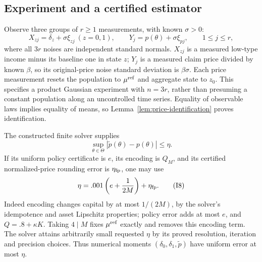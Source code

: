 \documentclass[11pt,a4paper]{article}
\begin{document}
\subsection{Experiment and a certified estimator}
Observe three groups of $r\geq1$ measurements, with known $\sigma>0$:
\[
 X_{zj}=\delta_z+\sigma\xi_{zj}\ (z=0,1),\qquad
 Y_j=p(\theta)+\sigma\xi_{pj},\qquad 1\leq j\leq r,          \tag{I6}
\]
where all $3r$ noises are independent standard normals. $X_{zj}$ is a
measured low-type income minus its baseline one in state $z$; $Y_j$ is a
measured claim price divided by known $\beta$, so its original-price noise
standard deviation is $\beta\sigma$. Each price measurement resets the
population to $\mu^{\rm ref}$ and aggregate state to $z_0$. This specifies
a product Gaussian experiment with $n=3r$, rather than presuming a constant
population along an uncontrolled time series. Equality of observable laws
implies equality of means, so Lemma~\ref{lem:price-identification} proves identification.

The constructed finite solver supplies
\[
 \sup_{\theta\in\Theta}|\widetilde p(\theta)-p(\theta)|\leq\eta. \tag{I7}
\]
If its uniform policy certificate is $e$, its encoding is $Q_M$, and its
certified normalized-price rounding error is $\eta_{\rm fp}$, one may use
\[
 \eta=.001\left(e+\frac1{2M}\right)+\eta_{\rm fp}.           \tag{I8}
\]
Indeed encoding changes capital by at most $1/(2M)$, by the solver's
idempotence and asset Lipschitz properties; policy error adds at most $e$,
and $Q=.8+\kappa K$. Taking $4\mid M$ fixes $\mu^{\rm ref}$ exactly and
removes this encoding term. The solver attains arbitrarily small requested
$\eta$ by its proved resolution, iteration and precision choices.
Thus numerical moments $(\delta_0,\delta_1,\widetilde p)$ have uniform error at most $\eta$.
\end{document}
